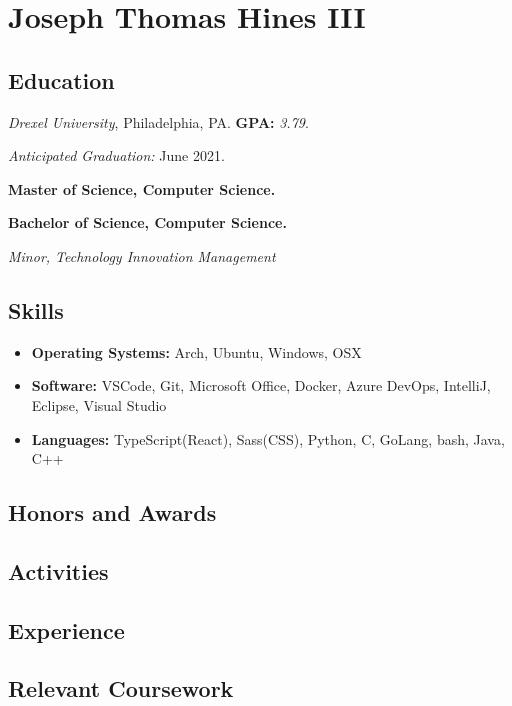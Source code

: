 \documentclass[10pt]{article}
\begin{document}
\section*{\huge Joseph Thomas Hines III}
\label{sec:title}

\begin{multicols}{2}
\subsection*{Education}%
\label{sub:Education}

\emph{Drexel University}, Philadelphia, PA. \textbf{GPA:} \emph{3.79}.

\emph{Anticipated Graduation:} June 2021.

\null

\textbf{Master of Science, Computer Science.}

\textbf{Bachelor of Science, Computer Science.}

\emph{Minor, Technology Innovation Management}

\subsection*{Skills}%
\label{sub:Skills}

\begin{itemize}
\setlength\itemsep{0.5em}
\item \textbf{Operating Systems:} Arch, Ubuntu, Windows, OSX
\item \textbf{Software:} VSCode, Git, Microsoft Office, Docker, Azure DevOps,
	IntelliJ, Eclipse, Visual Studio
\item \textbf{Languages:} TypeScript(React), Sass(CSS), Python, C, GoLang,
	bash, Java, C++
\end{itemize}

\subsection*{Honors and Awards}%
\label{sub:Honors and Awards}



\subsection*{Activities}%
\label{sub:Activities}

\vfill\null
\columnbreak

\subsection*{Experience}%
\label{sub:Experience}

\end{multicols}

\subsection*{Relevant Coursework}%
\label{sub:Relevant Coursework}
\end{document}
